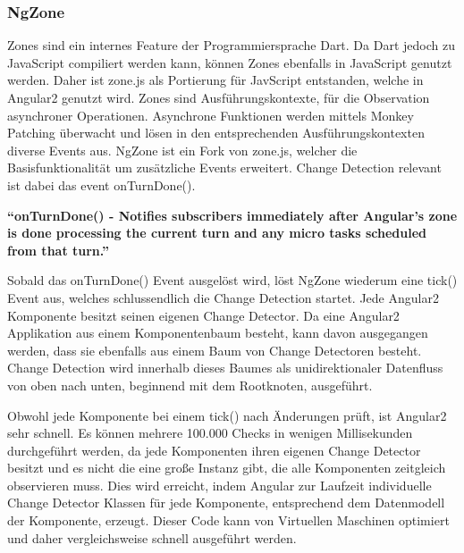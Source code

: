 \subsubsection{NgZone}

Zones sind ein internes Feature der Programmiersprache Dart. Da Dart jedoch zu JavaScript compiliert werden kann,
können Zones ebenfalls in JavaScript genutzt werden. Daher ist zone.js als Portierung für JavScript entstanden, welche in Angular2 genutzt wird.
Zones sind Ausführungskontexte, für die Observation asynchroner Operationen.
Asynchrone Funktionen werden mittels Monkey Patching überwacht und lösen in den entsprechenden Ausführungskontexten diverse Events aus.
NgZone ist ein Fork von zone.js, welcher die Basisfunktionalität um zusätzliche Events erweitert.
Change Detection relevant ist dabei das event onTurnDone().
\cite{changedetection-explained}

\vspace{0.5cm}
\textbf{``onTurnDone() - Notifies subscribers immediately after Angular’s zone is done processing the current turn and any micro tasks scheduled from that turn.''}
\cite{ZONESINANGULAR2}
\vspace{0.5cm}

Sobald das onTurnDone() Event ausgelöst wird, löst NgZone wiederum eine tick() Event aus, welches schlussendlich die Change Detection startet.
Jede Angular2 Komponente besitzt seinen eigenen Change Detector. Da eine Angular2 Applikation aus einem Komponentenbaum besteht,
kann davon ausgegangen werden, dass sie ebenfalls aus einem Baum von Change Detectoren besteht.
Change Detection wird innerhalb dieses Baumes als unidirektionaler Datenfluss von oben nach unten, beginnend mit dem Rootknoten, ausgeführt.

Obwohl jede Komponente bei einem tick() nach Änderungen prüft, ist Angular2 sehr schnell. Es können mehrere 100.000 Checks in wenigen Millisekunden durchgeführt werden,
da jede Komponenten ihren eigenen Change Detector besitzt und es nicht die eine große Instanz gibt, die alle Komponenten zeitgleich observieren muss.
Dies wird erreicht, indem Angular zur Laufzeit individuelle Change Detector Klassen für jede Komponente, entsprechend dem Datenmodell der Komponente, erzeugt.
Dieser Code kann von Virtuellen Maschinen optimiert und daher vergleichsweise schnell ausgeführt werden.

\vspace{1cm}

